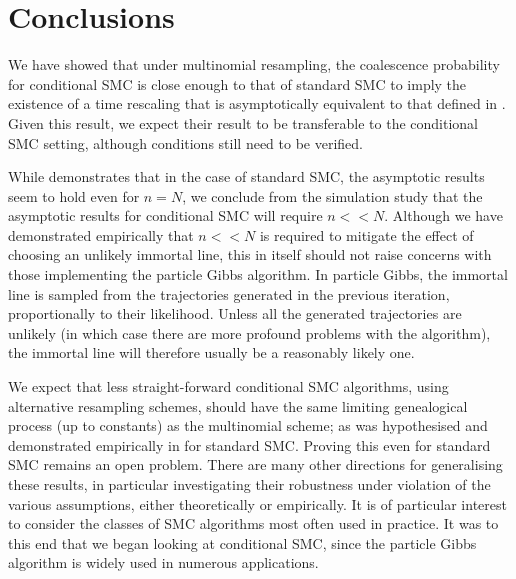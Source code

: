 \documentclass{article}
\begin{document}
\section{Conclusions}
We have showed that under multinomial resampling, the coalescence probability for conditional SMC is close enough to that of standard SMC to imply the existence of a time rescaling that is asymptotically equivalent to that defined in \citet[p.7]{koskela2018}. Given this result, we expect their result to be transferable to the conditional SMC setting, although conditions \citet[(3)--(4)]{koskela2018} still need to be verified.

While \citet[Section 3]{koskela2018} demonstrates that in the case of standard SMC, the asymptotic results seem to hold even for $n=N$, we conclude from the simulation study that the asymptotic results for conditional SMC will require $n << N$.
Although we have demonstrated empirically that $n <<N$ is required to mitigate the effect of choosing an unlikely immortal line, this in itself should not raise concerns with those implementing the particle Gibbs algorithm. In particle Gibbs, the immortal line is sampled from the trajectories generated in the previous iteration, proportionally to their likelihood. Unless all the generated trajectories are unlikely (in which case there are more profound problems with the algorithm), the immortal line will therefore usually be a reasonably likely one.

We expect that less straight-forward conditional SMC algorithms, using alternative resampling schemes, should have the same limiting genealogical process (up to constants) as the multinomial scheme; as was hypothesised and demonstrated empirically in \citet{koskela2018} for standard SMC. Proving this even for standard SMC remains an open problem.
There are many other directions for generalising these results, in particular investigating their robustness under violation of the various assumptions, either theoretically or empirically. It is of particular interest to consider the classes of SMC algorithms most often used in practice. It was to this end that we began looking at conditional SMC, since the particle Gibbs algorithm is widely used in numerous applications.


\end{document}
